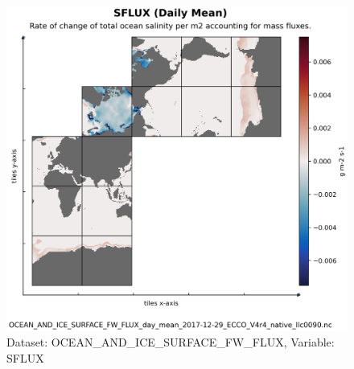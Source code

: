 \begin{figure}[H]
\centering
\includegraphics[scale=0.55]{../images/plots/native_plots/Ocean_and_Sea-Ice_Surface_Freshwater_Fluxes/SFLUX.png}
\caption{Dataset: OCEAN\_AND\_ICE\_SURFACE\_FW\_FLUX, Variable: SFLUX}
\label{tab:table-OCEAN_AND_ICE_SURFACE_FW_FLUX_SFLUX-Plot}
\end{figure}
\pagebreak
